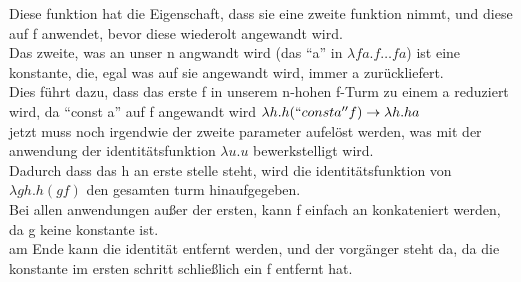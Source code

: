 \documentclass{article}
\begin{document}
	Diese funktion hat die Eigenschaft, dass sie eine zweite funktion nimmt, und diese auf f anwendet, bevor diese wiederolt angewandt wird.\\
	Das zweite, was an unser n angwandt wird (das ``a'' in $\lambda fa.f\dots f a$) ist eine konstante, die, egal was auf sie angewandt wird, immer a zurückliefert.\\
	Dies führt dazu, dass das erste f in unserem n-hohen f-Turm zu einem a reduziert wird, da ``const a'' auf f angewandt wird $\lambda h. h(``const a'' f)\to \lambda h.ha$\\
	jetzt muss noch irgendwie der zweite parameter aufelöst werden, was mit der anwendung der identitätsfunktion $\lambda u.u$ bewerkstelligt wird.\\
	Dadurch dass das h an erste stelle steht, wird die identitätsfunktion von $\lambda gh.h(gf)$ den gesamten turm hinaufgegeben.\\
	Bei allen anwendungen außer der ersten, kann f einfach an konkateniert werden, da g keine konstante ist.\\
	am Ende kann die identität entfernt werden, und der vorgänger steht da, da die konstante im ersten schritt schließlich ein f entfernt hat.\\
\end{document}
